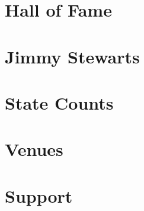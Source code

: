 \documentclass[8pt]{book}
\begin{document}
\chapter{Hall of Fame}

\begin{multicols*}{3}
\setlength{\columnseprule}{0.4pt}

\end{multicols*}


\chapter{Jimmy Stewarts}

\begin{multicols*}{3}
\setlength{\columnseprule}{0.4pt}

\end{multicols*}


\chapter{State Counts}

\begin{multicols*}{2}
\setlength{\columnseprule}{0.4pt}

\end{multicols*}

\chapter{Venues}

\begin{multicols*}{3}
\setlength{\columnseprule}{0.4pt}

\end{multicols*}

\chapter{Support}

\begin{multicols*}{3}
\setlength{\columnseprule}{0.4pt}

\end{multicols*}
\end{document}
